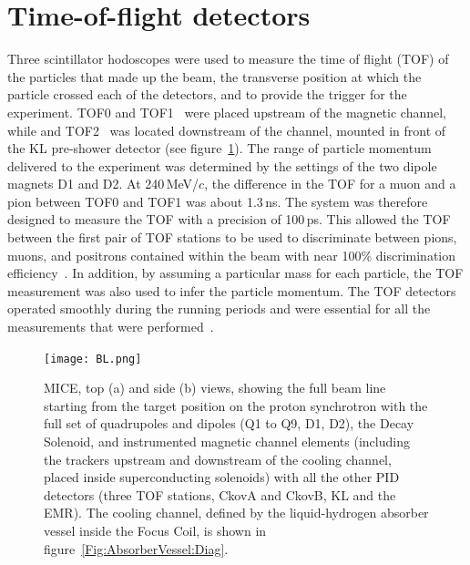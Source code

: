 \graphicspath{{02-TOF/Figures/}}

\newcommand{\Tzero}{\ensuremath{T0}}
\newcommand{\Gauss}{\ensuremath{\text{G}}}
\newcommand{\DT}{\ensuremath{\Delta T}}
\newcommand{\us}{\ensuremath{\mu\text{s}}}

\section{Time-of-flight detectors}
\label{Sect:TOF}

Three scintillator hodoscopes were used to measure the time of flight
(TOF) of the particles that made up the beam, the transverse position
at which the particle crossed each of the detectors, and to provide
the trigger for the experiment. 
TOF0 and TOF1~\cite{NOTE145,NOTE241,2010NIMPA.615...14B} were
placed upstream of the magnetic channel, while and TOF2~\cite{NOTE286}
was located downstream of the channel, mounted in front of the KL
pre-shower detector (see figure~\ref{fig:BL}).
The range of particle momentum delivered to the experiment was
determined by the settings of the two dipole magnets D1 and D2.
At 240\,MeV/$c$, the difference in the TOF for a muon and a
pion between TOF0 and TOF1 was about 1.3\,ns.
The system was therefore designed to measure the TOF with a
precision of 100\,ps. 
This allowed the TOF between the first pair of TOF stations 
to be used to discriminate between pions, muons, and positrons
contained within the beam with near 100\% discrimination
efficiency~\cite{2016JInst..11P3001A}.
In addition, by assuming a particular mass for each particle, the
TOF measurement was also used to infer the particle
momentum.
The TOF detectors operated smoothly during the running periods and
were essential for all the measurements that were
performed~\cite{Bogomilov:2012sr,Adams:2013lba,2015JInst..10P2012A,2016JInst..11P3001A,Adams:2018qhj,Bogomilov:2019kfj}.
\begin{figure}
  \begin{center}
    \texttt{[image: BL.png]}
    \caption{
      MICE, top (a) and side (b) views, showing the full beam line
      starting from the target position on the proton synchrotron with
      the full set of quadrupoles and dipoles (Q1 to Q9, D1, D2), the
      Decay Solenoid, and instrumented magnetic channel elements
      (including the trackers upstream and downstream of the cooling
      channel, placed inside superconducting solenoids) with all the
      other PID detectors (three TOF stations, CkovA and CkovB, KL and
      the EMR).
      The cooling channel, defined by the liquid-hydrogen absorber
      vessel inside the Focus Coil, is shown in
      figure~\ref{Fig:AbsorberVessel:Diag}.
    }
    \label{fig:BL}
  \end{center}
\end{figure}

